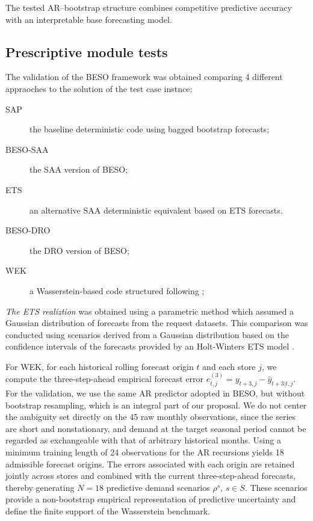 \documentclass[mnsc,sglanonrev]{informs4}  %
\theoremstyle{remark}\newtheorem{remark}{Remark}
\begin{document}
The tested AR–bootstrap structure combines competitive predictive accuracy with an interpretable base forecasting model.

\subsection{Prescriptive module tests}  \label{Subsec:prescrtest}

The validation of the BESO framework was obtained comparing 4 different appraoches to the solution of the test case instnce:
\begin{description}
\item[SAP] the baseline deterministic code using bagged bootstrap forecasts;
\item[BESO-SAA] the SAA version of BESO;
\item [ETS] an alternative SAA deterministic equivalent based on ETS forecasts.
\item[BESO-DRO] the DRO version of BESO;
\item [WEK] a Wasserstein-based code structured following \cite{EK18};
\end{description}

{\it The ETS realiztion} was obtained using a parametric method which assumed a Gaussian distribution of forecasts from the request datasets. This comparison was conducted using scenarios derived from a Gaussian distribution based on the confidence intervals of the forecasts provided by an Holt-Winters ETS model \citep{HKOS08}.

For WEK, for each historical rolling forecast origin $t$ and each store $j$, we compute the three-step-ahead empirical forecast error $ e_{t,j}^{(3)} = y_{t+3,j}-\hat y_{t+3|t,j} $. For the validation, we use the same AR predictor adopted in BESO, but without bootstrap resampling, which is an integral part of our proposal. We do not center the ambiguity set directly on the 45 raw monthly observations, since the series are short and nonstationary, and demand at the target seasonal period cannot be regarded as exchangeable with that of arbitrary historical months.
Using a minimum training length of 24 observations for the AR recursions yields 18 admissible forecast origins. The errors associated with each origin are retained jointly across stores and combined with the current three-step-ahead forecasts, thereby generating $N=18$ predictive demand scenarios $\rho^s$, $s\in S$. These scenarios provide a non-bootstrap empirical representation of predictive uncertainty and define the finite support of the Wasserstein benchmark.
\end{document}
